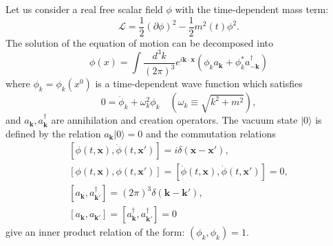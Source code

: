 \documentclass[twocolumn,showpacs,preprintnumbers,amsmath,amssymb,nofootinbib,superscriptaddress,prc]{revtex4}
\begin{document}
Let us consider a real free scalar field $\phi$ with the time-dependent mass term:
\begin{equation}
 \mathcal{L} = \frac{1}{2} (\partial \phi)^2 - \frac{1}{2}m^2(t) \phi^2.
\end{equation}
The solution of the equation of motion can be decomposed into 
\begin{equation}
 \phi(x) = \int \frac{d^3k}{(2\pi)^3} e^{i\mathbf{k \cdot x}}
  \left( \phi_k a_{\mathbf{k}} + \phi_k^* a_{-\mathbf{k}}^{\dagger} \right)  \label{eq:solution_time_dep}
\end{equation}
where $\phi_k=\phi_k(x^0)$ is a time-dependent wave function which satisfies
\begin{equation}
 0 = \ddot{\phi}_k + \omega_k^2 \phi_k \quad ( \omega_k\equiv\sqrt{k^2+m^2}),\label{eq:eom_wave_time_dep}
\end{equation}
and $a_{\mathbf{k}}, a_{\mathbf{k}}^\dagger$ are annihilation and creation operators. The vacuum state $|0\rangle$ is defined by the relation $a_{\mathbf{k}}|0\rangle=0$ and the commutation relations
\begin{eqnarray}
 &[\phi(t,\mathbf{x}),\dot{\phi}(t,\mathbf{x'})]=i\delta(\mathbf{x-x'}),&\\
 &[\phi(t,\mathbf{x}),\phi(t,\mathbf{x'})]=[\dot{\phi}(t,\mathbf{x}),\dot{\phi}(t,\mathbf{x'})]=0,&\\
 &[a_{\mathbf{k}}, a_{\mathbf{k'}}^\dagger]=(2\pi)^3\delta(\mathbf{k-k'}), &\\ & [a_{\mathbf{k}}, a_{\mathbf{k'}}]=[a_{\mathbf{k}}^\dagger, a_{\mathbf{k'}}^\dagger]=0&
\end{eqnarray}
give an inner product relation of the form: $(\phi_k,\phi_k)=1$.
\end{document}

